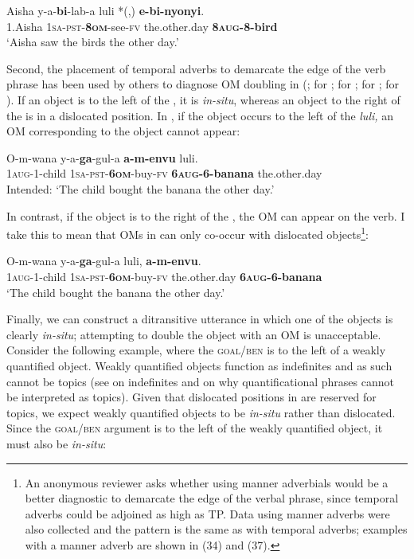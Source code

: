 \documentclass[output=paper
,newtxmath
,modfonts
,nonflat]{langsci/langscibook}
\begin{document}
\ea\label{ex:ranero:10}
\gll Aisha    y-a-\textbf{bi}{}-lab-a        luli           *(,) \textbf{e-bi-nyonyi}.\\
1.Aisha \textsc{1sa-pst-}\textbf{\textsc{8om}}{}-see-\textsc{fv} the.other.day   {}  \textbf{8\textsc{aug}}\textbf{{}-8-bird}\\
\glt ‘Aisha saw the birds the other day.’
\z

Second, the placement of temporal adverbs to demarcate the edge of the verb phrase has been used by others to diagnose OM doubling in  (\citealt{Henderson2006}; \citealt{Riedel2009} for ; \citealt{bax2012} for ; \citealt{dierckstoappear} for ; \citealt{zeller2009,Zeller2015} for ). If an object is to the left of the , it is \textit{in-situ}, whereas an object to the right of the  is in a dislocated position. In , if the object occurs to the left of the  \textit{luli,} an OM corresponding to the object cannot appear:

\ea\label{ex:ranero:11}
\gll *O-m-wana    y-a-\textbf{ga}{}-gul-a               \textbf{a-m-envu}           luli.\\
1\textsc{aug}{}-1-child \textsc{1sa-pst-}\textbf{\textsc{6om}}{}-buy-\textsc{fv} \textbf{6\textsc{aug}}\textbf{{}-6-banana} the.other.day\\
\glt Intended: ‘The child bought the banana the other day.’
\z

In contrast, if the object is to the right of the , the OM can appear on the verb. I take this to mean that OMs in  can only co-occur with dislocated objects\footnote{An anonymous reviewer asks whether using manner adverbials would be a better diagnostic to demarcate the edge of the verbal phrase, since temporal adverbs could be adjoined as high as TP. Data using manner adverbs were also collected and the pattern is the same as with temporal adverbs; examples with a manner adverb are shown in (34) and (37).}: 

\ea\label{ex:ranero:12}
\gll O-m-wana     y-a-\textbf{ga}{}-gul-a         luli,           \textbf{a-m-envu}.\\
1\textsc{aug}{}-1-child  \textsc{1sa-pst}{}-\textbf{\textsc{6om}}\textsc{{}-}buy-\textsc{fv}  the.other.day  \textbf{6\textsc{aug}}\textbf{{}-6-banana}\\
\glt ‘The child bought the banana the other day.’
\z

Finally, we can construct a ditransitive utterance in which one of the objects is clearly \textit{in-situ}; attempting to double the object with an OM is unacceptable. Consider the following example, where the \textsc{goal/ben} is to the left of a weakly quantified object. Weakly quantified objects function as indefinites and as such cannot be topics (see \citealt{Diesing1992} on indefinites and \citealt{Reinhart1981} on why quantificational phrases cannot be interpreted as topics). Given that dislocated positions in  are reserved for topics, we expect weakly quantified objects to be \textit{in-situ} rather than dislocated. Since the \textsc{goal/ben} argument is to the left of the weakly quantified object, it must also be \textit{in-situ}:
\end{document}
